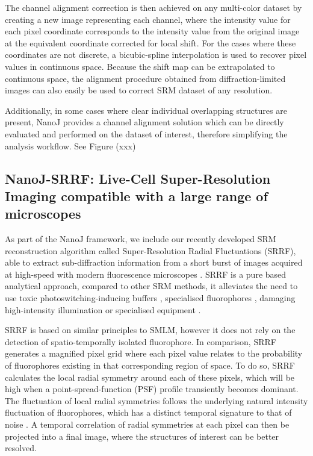  The channel alignment correction is then achieved on any multi-color dataset by creating a new image representing each channel, where the intensity value for each pixel coordinate corresponds to the intensity value from the original image at the equivalent coordinate corrected for local shift. For the cases where these coordinates are not discrete, a bicubic-spline interpolation is used to recover pixel values in continuous space. Because the shift map can be extrapolated to continuous space, the alignment procedure obtained from diffraction-limited images can also easily be used to correct SRM dataset of any resolution.

 Additionally, in some cases where clear individual overlapping structures are present, NanoJ provides a channel alignment solution which can be directly evaluated and performed on the dataset of interest, therefore simplifying the analysis workflow. See Figure (xxx)

\subsection*{NanoJ-SRRF: Live-Cell Super-Resolution Imaging compatible with a large range of microscopes}
 As part of the NanoJ framework, we include our recently developed SRM reconstruction algorithm called Super-Resolution Radial Fluctuations (SRRF), able to extract sub-diffraction information from a short burst of images acquired at high-speed with modern fluorescence microscopes \cite{gustafsson2016fast,culley2018srrf}. SRRF is a pure based analytical approach, compared to other SRM methods, it alleviates the need to use toxic photoswitching-inducing buffers \cite{henriques2011palm}, specialised fluorophores \cite{dempsey2011evaluation,henriques2009palm}, damaging high-intensity illumination \cite{waldchen2015light} or specialised equipment \cite{gustafsson2000surpassing,hell1994breaking}.
 
 SRRF is based on similar principles to SMLM, however it does not rely on the detection of spatio-temporally isolated fluorophore. In comparison, SRRF generates a magnified pixel grid where each pixel value relates to the probability of fluorophores existing in that corresponding region of space. To do so, SRRF calculates the local radial symmetry around each of these pixels, which will be high when a point-spread-function (PSF) profile transiently becomes dominant. The fluctuation of local radial symmetries follows the underlying natural intensity fluctuation of fluorophores, which has a distinct temporal signature to that of noise \cite{dertinger2009fast}. A temporal correlation of radial symmetries at each pixel can then be projected into a final image, where the structures of interest can be better resolved.
 
